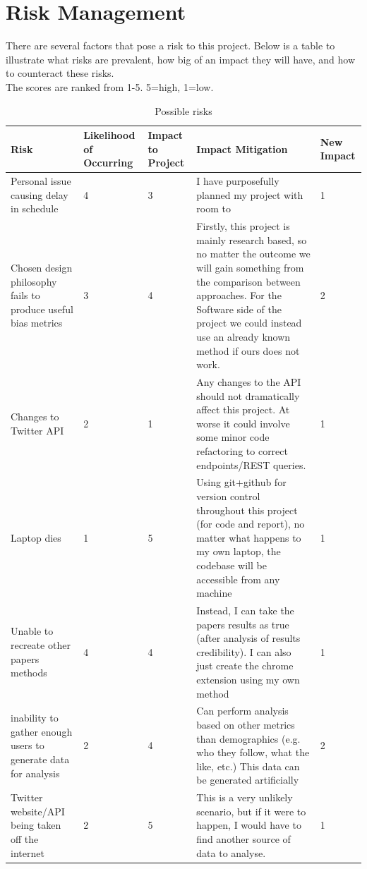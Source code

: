 \documentclass[a4paper,fleqn,10pt]{article}
\begin{document}
\section{Risk Management}
\label{sec:risk}
There are several factors that pose a risk to this project. Below is a table to illustrate what risks are prevalent, how big of an impact they will have, and how to counteract these risks.\\
The scores are ranked from 1-5. 5=high, 1=low.
\newpage
\begin{table}[!h]
    \begin{tabular}{|p{25mm}|p{20mm}|p{13mm}|p{55mm}|p{14mm}|}
    \hline
        Risk & Likelihood of Occurring & Impact to Project & Impact Mitigation & New Impact \\
        \hline
        Personal issue causing delay in schedule & 4 & 3 & I have purposefully planned my project with room to & 1 \\
        \hline
        Chosen design philosophy fails to produce useful bias metrics & 3 & 4 & Firstly, this project is mainly research based, so no matter the outcome we will gain something from the comparison between approaches. For the Software side of the project we could instead use an already known method if ours does not work. & 2 \\
        \hline
        Changes to Twitter API & 2 & 1 & Any changes to the API should not dramatically affect this project. At worse it could involve some minor code refactoring to correct endpoints/REST queries. & 1\\
        \hline
        Laptop dies & 1 & 5 & Using git+github for version control throughout this project (for code and report), no matter what happens to my own laptop, the codebase will be accessible from any machine & 1\\
        \hline
        Unable to recreate other papers methods & 4 & 4 & Instead, I can take the papers results as true (after analysis of results credibility). I can also just create the chrome extension using my own method & 1\\
        \hline
        inability to gather enough users to generate data for analysis & 2 & 4 & Can perform analysis based on other metrics than demographics (e.g. who they follow, what the like, etc.) This data can be generated artificially & 2\\
        \hline
        Twitter website/API being taken off the internet & 2 & 5 & This is a very unlikely scenario, but if it were to happen, I would have to find another source of data to analyse. & 1\\
    \end{tabular}
    \caption{Possible risks}
    \label{tab:risk}
\end{table}
\newpage
\end{document}
